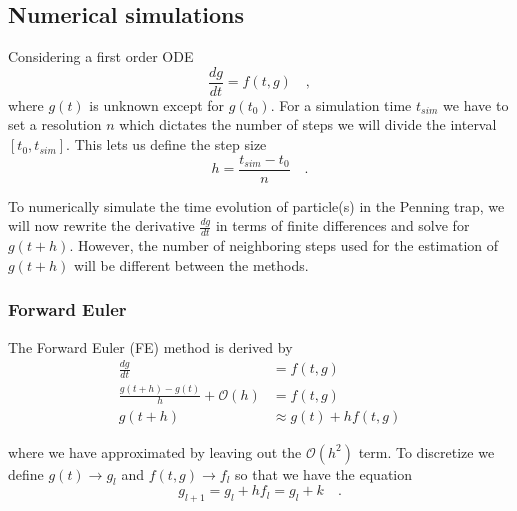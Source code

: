 \documentclass[../main_proj3.tex]{subfiles}
\begin{document}
\subsection{Numerical simulations}

Considering a first order ODE 
$$\frac{dg}{dt} = f(t,g)\quad,$$ 
where $g(t)$ is unknown except for $g(t_0)$. For a simulation time $t_{sim}$ we have to set a resolution $n$ which dictates the number of steps we will divide the interval $[t_0, t_{sim}]$. This lets us define the step size
\begin{equation}
    \label{eq:step_size}
    h = \frac{t_{sim}-t_0}{n} \quad.
\end{equation}

To numerically simulate the time evolution of particle(s) in the Penning trap, we will now rewrite the derivative $\frac{dg}{dt}$ in terms of finite differences and solve for $g(t+h)$. However, the number of neighboring steps used for the estimation of $g(t+h)$ will be different between the methods.

\subsubsection{Forward Euler}

The Forward Euler (FE) method is derived by 
\begin{equation*}
    \begin{split}
        \frac{dg}{dt} &= f(t,g) \\
        \frac{g(t+h) - g(t)}{h} + \mathcal{O}(h) &= f(t,g) \\
        g(t+h) &\approx g(t) + hf(t,g) 
    \end{split}
\end{equation*}

where we have approximated by leaving out the $\mathcal{O}(h^{2})$ term. To discretize we define $g(t) \to g_l$ and $f(t, g)\to f_l$ so that we have the equation
\begin{equation}
\label{eq:next_timestep_forward_euler}
g_{l+1} = g_l+ h f_l = g_l + k \quad.
\end{equation}
\end{document}
